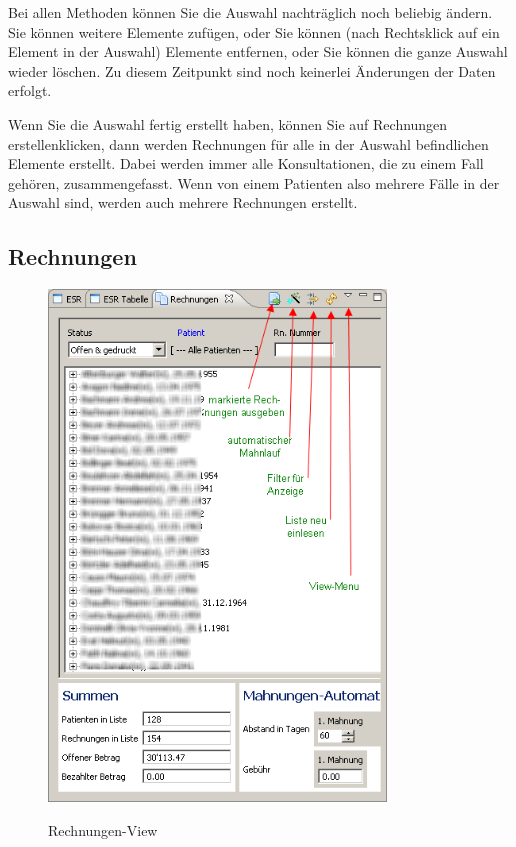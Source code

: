 Bei allen Methoden können Sie die Auswahl nachträglich noch beliebig ändern. Sie
können weitere Elemente zufügen, oder Sie können (nach Rechtsklick auf ein
Element in der Auswahl) Elemente entfernen, oder Sie können die ganze Auswahl
wieder löschen. Zu diesem Zeitpunkt sind noch keinerlei Änderungen der Daten
erfolgt.

Wenn Sie die Auswahl fertig erstellt haben, können Sie auf \glqq Rechnungen
erstellen\grqq klicken, dann werden Rechnungen für alle in der Auswahl
befindlichen Elemente erstellt. Dabei werden immer alle Konsultationen, die zu
einem Fall gehören, zusammengefasst. Wenn von einem Patienten also mehrere Fälle
in der Auswahl sind, werden auch mehrere Rechnungen erstellt.

\clearpage

\subsection{Rechnungen}
\begin{figure}[ht]
  \includegraphics[width=0.8\textwidth]{images/rechnungsview}\\
  \caption{Rechnungen-View}\label{fig:rechnungen}
\end{figure}

